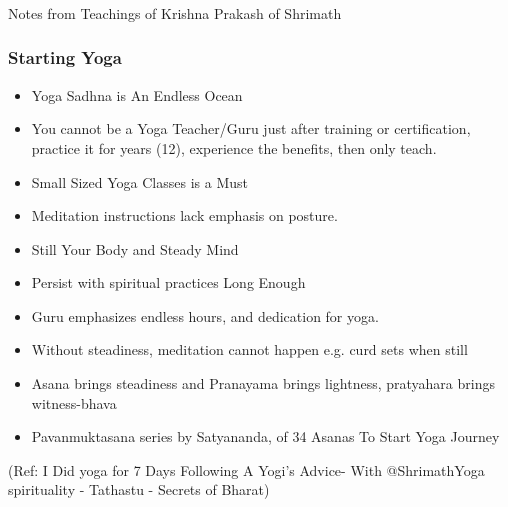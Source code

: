\begin{frame}[fragile]\frametitle{}
\begin{center}
{\Large Notes from Teachings of Krishna Prakash of Shrimath}
\end{center}
\end{frame}

\begin{frame}[fragile]\frametitle{Starting Yoga}

	\begin{itemize}
	\item Yoga Sadhna is An Endless Ocean	
	\item You cannot be a Yoga Teacher/Guru just after training or certification, practice it for years (12), experience the benefits, then only teach.
	\item Small Sized Yoga Classes is a Must
	\item Meditation instructions lack emphasis on posture.
	\item Still Your Body and Steady Mind
	\item Persist with spiritual practices Long Enough
	\item Guru emphasizes endless hours, and dedication for yoga.
	\item Without steadiness, meditation cannot happen e.g. curd sets when still
	\item Asana brings steadiness and Pranayama brings lightness, pratyahara brings witness-bhava
	\item Pavanmuktasana series by Satyananda, of 34 Asanas To Start Yoga Journey
	\end{itemize}

{\tiny (Ref:  I Did yoga for 7 Days Following A Yogi's Advice- With ‪@ShrimathYoga‬  spirituality - Tathastu - Secrets of Bharat)}

\end{frame}


